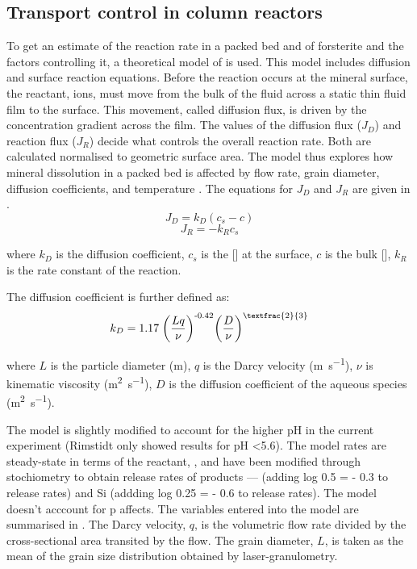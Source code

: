 \subsection{Transport control in column reactors}
To get an estimate of the reaction rate in a packed bed and of forsterite and the factors controlling it, a theoretical model of \cite{rimstidt2015} is used. This model includes diffusion and surface reaction equations. Before the reaction occurs at the mineral surface, the reactant,  ions, must move from the bulk of the fluid across a static thin fluid film to the surface. This movement, called diffusion flux, is driven by the concentration gradient across the film. The values of the diffusion flux ($J_D$) and reaction flux ($J_R$) decide what controls the overall reaction rate. Both are calculated normalised to geometric surface area. The model thus explores how mineral dissolution in a packed bed is affected by flow rate, grain diameter, diffusion coefficients, and temperature \citep{rimstidt2015}. The equations for $J_D$ and $J_R$ are given in .
\begin{equation}\label{eq:results_diff}
J_D=k_D(c_s-c)
\end{equation}
\begin{equation}
J_R=-k_Rc_s
\end{equation}

where $k_D$ is the diffusion coefficient, $c_s$ is the [] at the surface, $c$ is the bulk [], $k_R$ is the rate constant of the reaction. 

The diffusion coefficient is further defined as:
\begin{equation}\label{eq:results_kd}
k_D=\text{1.17}\;{\left( \frac{Lq}{\nu}\right)}^{\text{-0.42}}{\left( \frac{D}{\nu}\right) }^{\textfrac{2}{3}}
\end{equation}

where $L$ is the particle diameter (m), $q$ is the Darcy velocity (\si{\metre\per\second}), $\nu$ is kinematic viscosity (\si{\square\metre\per\second}), $D$ is the diffusion coefficient of the aqueous species (\si{\square\metre\per\second}).

The model is slightly modified to account for the higher pH in the current experiment (Rimstidt only showed results for pH \num{<5.6}). The model rates are steady-state in terms of the reactant, , and have been modified through stochiometry to obtain release rates of products ---  (adding log 0.5 = - 0.3 to  release rates) and Si (addding log 0.25 = - 0.6 to  release rates). The model doesn't acccount for p affects. The variables entered into the model are summarised in . The Darcy velocity, $q$, is the volumetric flow rate divided by the cross-sectional area transited by the flow. The grain diameter, $L$, is taken as the mean of the grain size distribution obtained by laser-granulometry. \\

